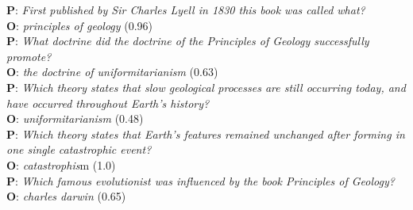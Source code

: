 \noindent
\textbf{P}: \textit{First published by Sir Charles Lyell in 1830 this book was called what?}\\
\textbf{O}: \textit{principles of geology} (0.96)\\[4pt]
\textbf{P}: \textit{What doctrine did the doctrine of the Principles of Geology successfully promote?}\\
\textbf{O}: \textit{the doctrine of uniformitarianism} (0.63)\\[4pt]
\textbf{P}: \textit{Which theory states that slow geological processes are still occurring today, and have occurred throughout Earth's history?}\\
\textbf{O}: \textit{uniformitarianism} (0.48)\\[4pt]
\textbf{P}: \textit{Which theory states that Earth's features remained unchanged after forming in one single catastrophic event?}\\
\textbf{O}: \textit{catastrophis}m (1.0)\\[4pt]
\textbf{P}: \textit{Which famous evolutionist was influenced by the book Principles of Geology?}\\
\textbf{O}: \textit{charles darwin} (0.65)

\normalsize
